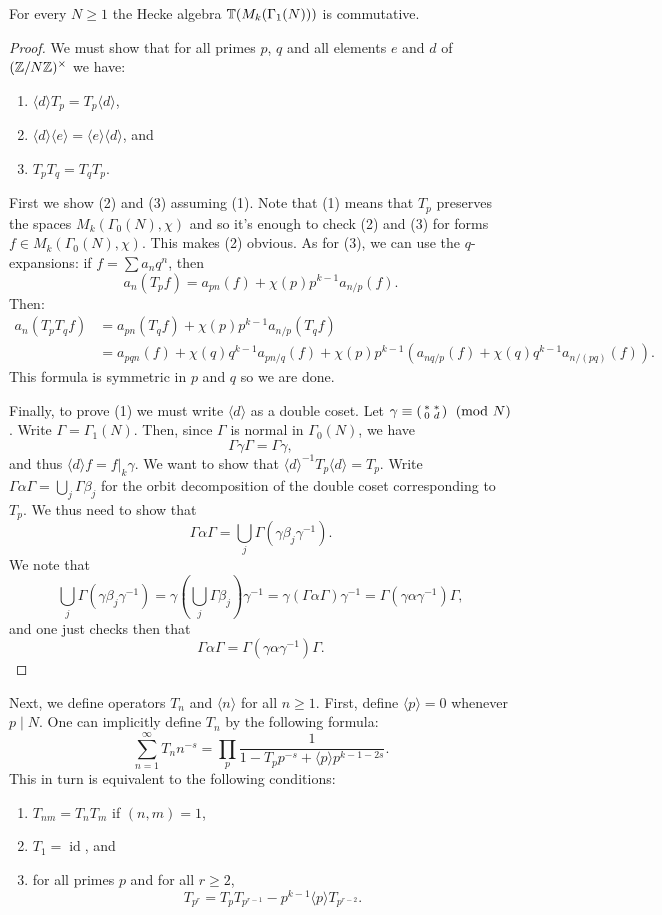 \begin{theorem}
  For every $N\geq 1$ the Hecke algebra $\mathbb{T}(M_k(\Gamma_1(N)))$ is commutative.
\end{theorem}
\begin{proof}
We must show that for all primes $p$, $q$ and all elements $e$ and $d$ of $(\mathbb{Z}/N\mathbb{Z})^\times$ we have:
  \begin{enumerate}
  \item $\langle d\rangle T_p = T_p \langle d\rangle$,
  \item $\langle d \rangle \langle e\rangle = \langle e\rangle\langle d\rangle$, and
  \item $T_p T_q = T_q T_p$.
  \end{enumerate}

First we show (2) and (3) assuming (1). Note that (1) means that $T_p$ preserves the spaces $M_k(\Gamma_0(N),\chi)$ and so it's enough to check (2) and (3) for forms $f\in M_k(\Gamma_0(N),\chi)$. This makes (2) obvious. As for (3), we can use the $q$-expansions: if $f=\sum a_n q^n$, then
\[
a_n(T_p f)= a_{pn}(f) + \chi(p)p^{k-1} a_{n/p}(f).
\]
Then:
\begin{align*}
a_n(T_pT_qf) &= a_{pn}(T_qf) + \chi(p)p^{k-1}a_{n/p}(T_qf)\\
&=a_{pqn}(f) + \chi(q) q^{k-1} a_{pn/q}(f)+\chi(p)p^{k-1}(a_{nq/p}(f)+\chi(q) q^{k-1} a_{n/(pq)}(f)).
\end{align*}
This formula is symmetric in $p$ and $q$ so we are done.

Finally, to prove (1) we must write $\langle d\rangle$ as a double coset. Let $\gamma\equiv \left(\begin{smallmatrix}*&*\\0&d\end{smallmatrix}\right)\pmod N$. Write $\Gamma=\Gamma_1(N)$. Then, since $\Gamma$ is normal in $\Gamma_0(N)$, we have
\[
\Gamma\gamma\Gamma=\Gamma\gamma,
\]
and thus $\langle d\rangle f = f|_k \gamma$. We want to show that $\langle d\rangle^{-1}T_p\langle d\rangle = T_p$. Write $\Gamma\alpha\Gamma=\bigcup_j \Gamma \beta_j$ for the orbit decomposition of the double coset corresponding to $T_p$. We thus need to show that
\[
\Gamma\alpha\Gamma=\bigcup_j \Gamma(\gamma\beta_j\gamma^{-1}).
\]
We note that
\[
\bigcup_j \Gamma (\gamma\beta_j\gamma^{-1}) = \gamma\left(\bigcup_j \Gamma \beta_j\right)\gamma^{-1} = \gamma(\Gamma\alpha\Gamma)\gamma^{-1} = \Gamma(\gamma\alpha\gamma^{-1})\Gamma,
\]
and one just checks then that
\[
\Gamma\alpha\Gamma = \Gamma(\gamma\alpha\gamma^{-1})\Gamma.
\]
\end{proof}

Next, we define operators $T_n$ and $\langle n\rangle$ for all $n\geq 1$. First, define $\langle p\rangle =0$ whenever $p\mid N$. One can implicitly define $T_n$ by the following formula:
\[
\sum_{n=1}^\infty T_n n^{-s} = \prod_p \frac{1}{1-T_pp^{-s} + \langle p\rangle p^{k-1-2s}}.
\]
This in turn is equivalent to the following conditions:
\begin{enumerate}
\item $T_{nm} = T_n T_m$ if $(n,m)=1$,
\item $T_1 = \operatorname{id}$, and
\item for all primes $p$ and for all $r\geq 2$,
\[
T_{p^r} = T_p T_{p^{r-1}} - p^{k-1}\langle p\rangle T_{p^{r-2}}.
\]
\end{enumerate}

